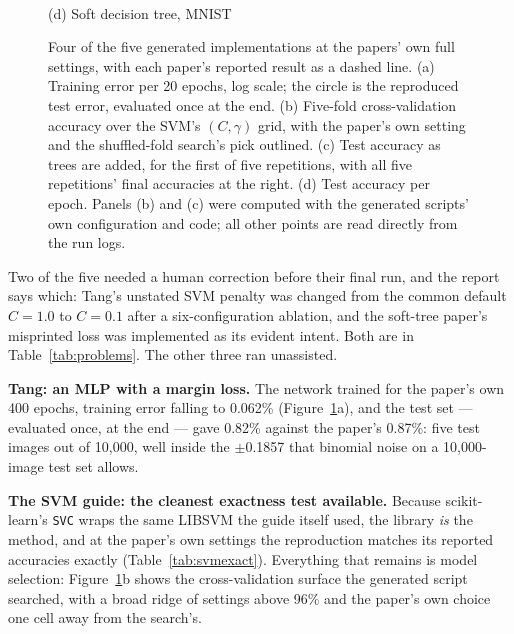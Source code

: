 \documentclass[11pt]{article}
\begin{document}
\begin{figure}[tbp]
\begin{minipage}[t]{0.49\linewidth}
{}\\[-1pt]
{\small (d) Soft decision tree, MNIST}
\end{minipage}
\caption{Four of the five generated implementations at the papers' own full settings, with each
paper's reported result as a dashed line. (a) Training error per 20 epochs, log scale; the circle
is the reproduced test error, evaluated once at the end. (b) Five-fold cross-validation accuracy
over the SVM's $(C, \gamma)$ grid, with the paper's own setting and the shuffled-fold search's
pick outlined. (c) Test accuracy as trees are added, for the first of five repetitions, with all
five repetitions' final accuracies at the right. (d) Test accuracy per epoch. Panels (b) and (c)
were computed with the generated scripts' own configuration and code; all other points are read
directly from the run logs.}
\label{fig:curves}
\end{figure}


Two of the five needed a human correction before their final run, and the report says which:
Tang's unstated SVM penalty was changed from the common default $C = 1.0$ to $C = 0.1$ after a
six-configuration ablation, and the soft-tree paper's misprinted loss was implemented as its
evident intent. Both are in Table~\ref{tab:problems}. The other three ran unassisted.

\textbf{Tang: an MLP with a margin loss.} The network trained for the paper's own 400 epochs,
training error falling to 0.062\% (Figure~\ref{fig:curves}a), and the test set --- evaluated once,
at the end --- gave 0.82\% against the paper's 0.87\%: five test images out of 10{,}000, well
inside the $\pm$0.1857 that binomial noise on a 10{,}000-image test set allows.

\textbf{The SVM guide: the cleanest exactness test available.} Because scikit-learn's
\texttt{SVC} wraps the same LIBSVM the guide itself used, the library \emph{is} the method, and
at the paper's own settings the reproduction matches its reported accuracies exactly
(Table~\ref{tab:svmexact}). Everything that remains is model selection:
Figure~\ref{fig:curves}b shows the cross-validation surface the generated script searched, with a
broad ridge of settings above 96\% and the paper's own choice one cell away from the search's.
\end{document}
